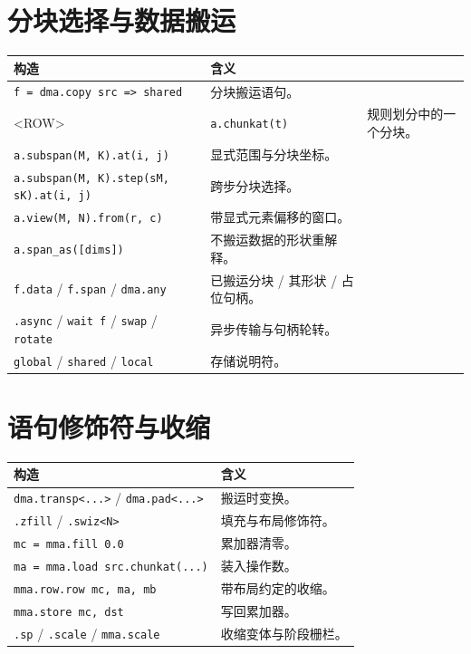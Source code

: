 \section{分块选择与数据搬运}
\begin{table}[htbp]\centering\small
\begin{tabularx}{\linewidth}{@{}lXX@{}}
\toprule
构造 & 含义 \\
\midrule
\texttt{f = dma.copy src =\textgreater{} shared} & 分块搬运语句。 &  \\
\textless{}ROW\textgreater{} & \texttt{a.chunkat(t)} & 规则划分中的一个分块。 \\
\texttt{a.subspan(M, K).at(i, j)} & 显式范围与分块坐标。 &  \\
\texttt{a.subspan(M, K).step(sM, sK).at(i, j)} & 跨步分块选择。 &  \\
\texttt{a.view(M, N).from(r, c)} & 带显式元素偏移的窗口。 &  \\
\texttt{a.span\_as([dims])} & 不搬运数据的形状重解释。 &  \\
\texttt{f.data} / \texttt{f.span} / \texttt{dma.any} & 已搬运分块 / 其形状 / 占位句柄。 &  \\
\texttt{.async} / \texttt{wait f} / \texttt{swap} / \texttt{rotate} & 异步传输与句柄轮转。 &  \\
\texttt{global} / \texttt{shared} / \texttt{local} & 存储说明符。 &  \\
\bottomrule
\end{tabularx}
\end{table}

\section{语句修饰符与收缩}
\begin{table}[htbp]\centering\small
\begin{tabularx}{\linewidth}{@{}lX@{}}
\toprule
构造 & 含义 \\
\midrule
\texttt{dma.transp\textless{}...\textgreater{}} / \texttt{dma.pad\textless{}...\textgreater{}} & 搬运时变换。 \\
\texttt{.zfill} / \texttt{.swiz\textless{}N\textgreater{}} & 填充与布局修饰符。 \\
\texttt{mc = mma.fill 0.0} & 累加器清零。 \\
\texttt{ma = mma.load src.chunkat(...)} & 装入操作数。 \\
\texttt{mma.row.row mc, ma, mb} & 带布局约定的收缩。 \\
\texttt{mma.store mc, dst} & 写回累加器。 \\
\texttt{.sp} / \texttt{.scale} / \texttt{mma.scale} & 收缩变体与阶段栅栏。 \\
\bottomrule
\end{tabularx}
\end{table}

